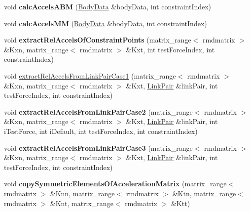 \begin{DoxyCompactItemize}
\item 
\hypertarget{classOpenHRP_1_1CFSImpl_a8e10cc8476416fe65963976b600e729a}{void {\bfseries calc\-Accels\-A\-B\-M} (\hyperlink{structOpenHRP_1_1CFSImpl_1_1BodyData}{Body\-Data} \&body\-Data, int constraint\-Index)}\label{classOpenHRP_1_1CFSImpl_a8e10cc8476416fe65963976b600e729a}

\item 
\hypertarget{classOpenHRP_1_1CFSImpl_a5da8525c17cb00e8b616fea35c4404ac}{void {\bfseries calc\-Accels\-M\-M} (\hyperlink{structOpenHRP_1_1CFSImpl_1_1BodyData}{Body\-Data} \&body\-Data, int constraint\-Index)}\label{classOpenHRP_1_1CFSImpl_a5da8525c17cb00e8b616fea35c4404ac}

\item 
\hypertarget{classOpenHRP_1_1CFSImpl_ac7b128a0adec7c1b56d5ee4fbb4617a3}{void {\bfseries extract\-Rel\-Accels\-Of\-Constraint\-Points} (matrix\-\_\-range$<$ rmdmatrix $>$ \&Kxn, matrix\-\_\-range$<$ rmdmatrix $>$ \&Kxt, int test\-Force\-Index, int constraint\-Index)}\label{classOpenHRP_1_1CFSImpl_ac7b128a0adec7c1b56d5ee4fbb4617a3}

\item 
void \hyperlink{classOpenHRP_1_1CFSImpl_a3032163447ca65ec81dc2a5c29cecf34}{extract\-Rel\-Accels\-From\-Link\-Pair\-Case1} (matrix\-\_\-range$<$ rmdmatrix $>$ \&Kxn, matrix\-\_\-range$<$ rmdmatrix $>$ \&Kxt, \hyperlink{structOpenHRP_1_1CFSImpl_1_1LinkPair}{Link\-Pair} \&link\-Pair, int test\-Force\-Index, int constraint\-Index)
\item 
\hypertarget{classOpenHRP_1_1CFSImpl_a5ebe62f5ba977f03210fe786b7f6678f}{void {\bfseries extract\-Rel\-Accels\-From\-Link\-Pair\-Case2} (matrix\-\_\-range$<$ rmdmatrix $>$ \&Kxn, matrix\-\_\-range$<$ rmdmatrix $>$ \&Kxt, \hyperlink{structOpenHRP_1_1CFSImpl_1_1LinkPair}{Link\-Pair} \&link\-Pair, int i\-Test\-Force, int i\-Default, int test\-Force\-Index, int constraint\-Index)}\label{classOpenHRP_1_1CFSImpl_a5ebe62f5ba977f03210fe786b7f6678f}

\item 
\hypertarget{classOpenHRP_1_1CFSImpl_a21a0ea949e79d978d63392d4c7427dc5}{void {\bfseries extract\-Rel\-Accels\-From\-Link\-Pair\-Case3} (matrix\-\_\-range$<$ rmdmatrix $>$ \&Kxn, matrix\-\_\-range$<$ rmdmatrix $>$ \&Kxt, \hyperlink{structOpenHRP_1_1CFSImpl_1_1LinkPair}{Link\-Pair} \&link\-Pair, int test\-Force\-Index, int constraint\-Index)}\label{classOpenHRP_1_1CFSImpl_a21a0ea949e79d978d63392d4c7427dc5}

\item 
\hypertarget{classOpenHRP_1_1CFSImpl_ad005e54fb6c1d3fc42b4fc5bdc35bcb3}{void {\bfseries copy\-Symmetric\-Elements\-Of\-Acceleration\-Matrix} (matrix\-\_\-range$<$ rmdmatrix $>$ \&Knn, matrix\-\_\-range$<$ rmdmatrix $>$ \&Ktn, matrix\-\_\-range$<$ rmdmatrix $>$ \&Knt, matrix\-\_\-range$<$ rmdmatrix $>$ \&Ktt)}\label{classOpenHRP_1_1CFSImpl_ad005e54fb6c1d3fc42b4fc5bdc35bcb3}


\end{DoxyCompactItemize}
